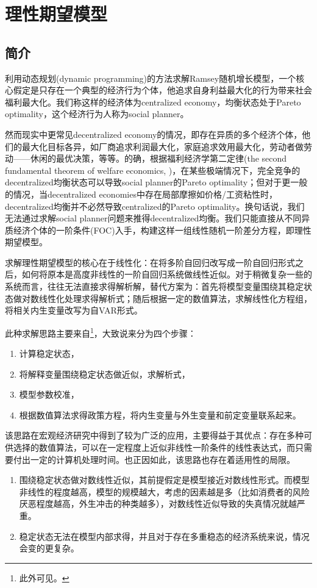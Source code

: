 \chapter{理性期望模型}
\label{sec:rational-exp-chap}

\section{简介}
利用动态规划(dynamic programming)的方法求解Ramsey随机增长模型，一个核心假定是只存在一个典型的经济行为个体，他追求自身利益最大化的行为带来社会福利最大化。我们称这样的经济体为centralized economy，均衡状态处于Pareto optimality，这个经济行为人称为social planner。

然而现实中更常见decentralized economy的情况，即存在异质的多个经济个体，他们的最大化目标各异，如厂商追求利润最大化，家庭追求效用最大化，劳动者做劳动——休闲的最优决策，等等。的确，根据福利经济学第二定律(the second fundamental theorem of welfare economics, \cite[p.151]{MasColell:1995ue})，在某些极端情况下，完全竞争的decentralized均衡状态可以导致social planner的Pareto optimality；但对于更一般的情况，当decentralized economies中存在局部摩擦如价格/工资粘性时，decentralized均衡并不必然导致centralized的Pareto optimality。换句话说，我们无法通过求解social planner问题来推得decentralized均衡。我们只能直接从不同异质经济个体的一阶条件(FOC)入手，构建这样一组线性随机一阶差分方程，即理性期望模型。

求解理性期望模型的核心在于线性化：在将多阶自回归改写成一阶自回归形式之后，如何将原本是高度非线性的一阶自回归系统做线性近似。对于稍微复杂一些的系统而言，往往无法直接求得解析解，替代方案为：首先将模型变量围绕其稳定状态做对数线性化处理求得解析式；随后根据一定的数值算法，求解线性化方程组，将相关内生变量改写为自VAR形式。

此种求解思路主要来自\cite{King:1988bk, King:1988kf}\footnote{此外可见\cite{King:1999jc}。}，大致说来分为四个步骤：
\begin{enumerate}
  \item 计算稳定状态，
  \item 将解释变量围绕稳定状态做近似，求解析式，
  \item 模型参数校准，
  \item 根据数值算法求得政策方程，将内生变量与外生变量和前定变量联系起来。
\end{enumerate}

该思路在宏观经济研究中得到了较为广泛的应用，主要得益于其优点：存在多种可供选择的数值算法，可以在一定程度上近似非线性一阶条件的线性表达式，而只需要付出一定的计算机处理时间。也正因如此，该思路也存在着适用性的局限。
\begin{enumerate}
  \item 围绕稳定状态做对数线性近似，其前提假定是模型接近对数线性形式。而模型非线性的程度越高，模型的规模越大，考虑的因素越是多（比如消费者的风险厌恶程度越高，外生冲击的种类越多），对数线性近似导致的失真情况就越严重。
  \item 稳定状态无法在模型内部求得，并且对于存在多重稳态的经济系统来说，情况会变的更复杂。
\end{enumerate}


